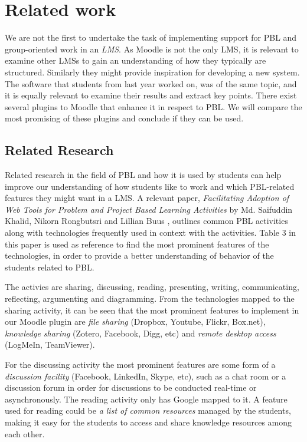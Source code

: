 \section{Related work}
We are not the first to undertake the task of implementing support for PBL and group-oriented work in an \textit{LMS}. 
As Moodle is not the only LMS, it is relevant to examine other LMSs to gain an understanding of how they typically are structured. 
Similarly they might provide inspiration for developing a new system.
The software that students from last year worked on, was of the same topic, and it is equally relevant to examine their results and extract key points.
There exist several plugins to Moodle that enhance it in respect to PBL. We will compare the most promising of these plugins and conclude if they can be used.

\subsection{Related Research}
Related research in the field of PBL and how it is used by students can help improve our understanding of how students like to work and which PBL-related features they might want in a LMS.
A relevant paper, \textit{Facilitating Adoption of Web Tools for Problem and Project Based Learning Activities} by Md. Saifuddin Khalid, Nikorn Rongbutsri and Lillian Buus \citep{khalidRongbutsriBuus}, outlines common PBL activities along with technologies frequently used in context with the activities.
Table 3  in this paper is used as reference to find the most prominent features of the technologies, in order to provide a better understanding of behavior of the students related to PBL.

The activies are sharing, discussing, reading, presenting, writing, communicating, reflecting, argumenting and diagramming.
From the technologies mapped to the sharing activity, it can be seen that the most prominent features to implement in our Moodle plugin are \textit{file sharing} (Dropbox, Youtube, Flickr, Box.net), \textit{knowledge sharing} (Zotero, Facebook, Digg, etc) and \textit{remote desktop access} (LogMeIn, TeamViewer).

For the discussing activity the most prominent features are some form of a \textit{discussion facility} (Facebook, LinkedIn, Skype, etc), such as a chat room or a discussion forum in order for discussions to be conducted real-time or asynchronously.
The reading activity only has Google mapped to it.
A feature used for reading could be \textit{a list of common resources} managed by the students, making it easy for the students to access and share knowledge resources among each other.

